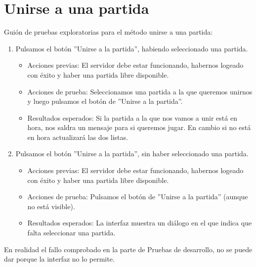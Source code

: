 \section{Unirse a una partida}

Guión de pruebas exploratorias para el método unirse a una partida:

\begin{enumerate}
\item Pulsamos el botón ''Unirse a la partida'', habiendo seleccionado una partida.
	\begin{itemize}
	\item Acciones previas: El servidor debe estar funcionando, habernos logeado con éxito y haber una partida libre disponible.
	\item Acciones de prueba: Seleccionamos una partida a la que queremos unirnos y luego pulsamos el botón de ''Unirse a la partida''.
	\item Resultados esperados: Si la partida a la que nos vamos a unir está en hora, nos saldra un mensaje para si queremos jugar. En cambio si no está en hora actualizará las dos listas.
	\end{itemize}
\item Pulsamos el botón ''Unirse a la partida'', sin haber seleccionado una partida.
	\begin{itemize}
	\item Acciones previas: El servidor debe estar funcionando, habernos logeado con éxito y haber una partida libre disponible.
	\item Acciones de prueba: Pulsamos el botón de ''Unirse a la partida'' (aunque no está visible).
	\item Resultados esperados: La interfaz muestra un diálogo en el que indica que falta seleccionar una partida.
	\end{itemize}
\end{enumerate}

En realidad el fallo comprobado en la parte de Pruebas de desarrollo, no se puede dar porque la interfaz no lo permite.
